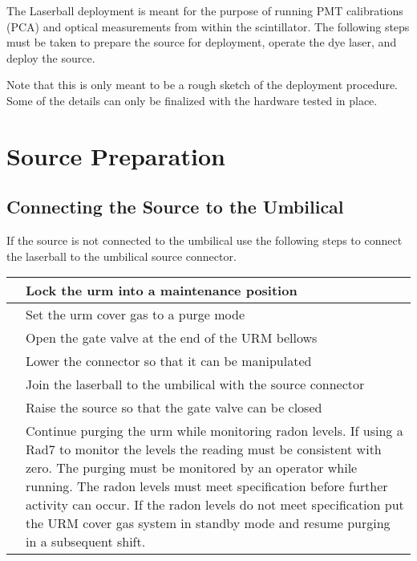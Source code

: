 The Laserball deployment is meant for the purpose of running PMT calibrations (PCA) and optical measurements from within the scintillator. The following steps must be taken to prepare the source for deployment, operate the dye laser, and deploy the source. 

Note that this is only meant to be a rough sketch of the deployment procedure. Some of the details can only be finalized with the hardware tested in place. 

\section{Source Preparation}

\subsection{Connecting the Source to the Umbilical}
If the source is not connected to the umbilical use the following steps to connect the laserball to the umbilical source connector.
\begin{tabular}{|c|p{4cm}|}
\hline
 &  Lock the urm into a maintenance position  \\ \hline
 &  Set the urm cover gas to a purge mode \\ \hline
 &  Open the gate valve at the end of the URM bellows \\ \hline
 &  Lower the connector so that it can be manipulated \\ \hline
 &  Join the laserball to the umbilical with the source connector \\ \hline
 &  Raise the source so that the gate valve can be closed \\ \hline
 &  Continue purging the urm while monitoring radon levels. If using a Rad7 to monitor the levels the reading must be consistent with zero. The purging must be monitored by an operator while running. The radon levels must meet specification before further activity can occur. If the radon levels do not meet specification put the URM cover gas system in standby mode and resume purging in a subsequent shift. \\ \hline
 \end{tabular}
 
